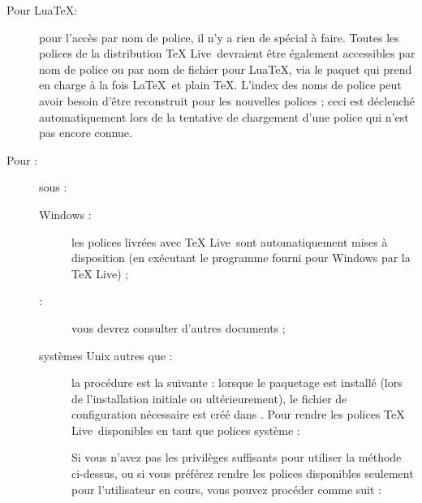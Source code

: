 \documentclass[german, english, french]{article}
\renewcommand{\TL}{\TeX{} Live\xspace}%
\begin{document}
\begin{description}
\item[Pour Lua\TeX :] pour l'accès par nom de police, il n'y a rien de spécial
  à faire. Toutes les polices de la distribution \TL\ devraient être également
  accessibles par nom de police ou par nom de fichier pour Lua\TeX, via le
  paquet  qui prend en charge à la fois \LaTeX\ et plain
  \TeX{}. L'index des noms de police  peut avoir besoin
  d'être reconstruit pour les nouvelles polices ; ceci est déclenché
  automatiquement lors de la tentative de chargement d'une police qui n'est pas
  encore connue.
\item[Pour \XeTeX :] sous :
  \begin{description}
  \item[Windows :] les polices livrées avec \TL\ sont automatiquement mises
    à disposition (en exécutant le programme  fourni pour
    Windows par la \TL) ;
  \item[\macOS{} :] vous devrez consulter d'autres documents ;
  \item[systèmes Unix autres que \macOS{} :] la procédure est la suivante :
    lorsque le paquetage  est installé (lors de l'installation
    initiale ou ultérieurement), le fichier de configuration nécessaire est créé
    dans . Pour rendre
    les polices \TL\ disponibles en tant que polices système :
    Si vous n'avez pas les privilèges suffisants pour utiliser la méthode
    ci-dessus, ou si vous préférez rendre les polices disponibles seulement pour
    l'utilisateur en cours, vous pouvez procéder comme suit :
  \end{description}
\end{description}
\end{document}
